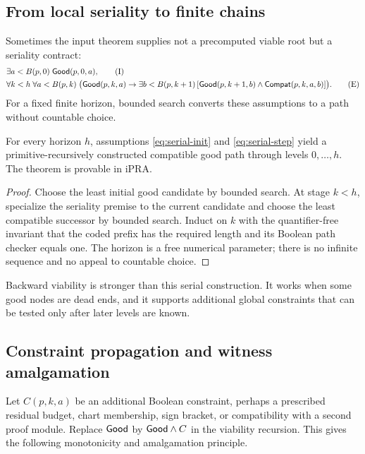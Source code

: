 \subsection{From local seriality to finite chains}

Sometimes the input theorem supplies not a precomputed viable root but a
seriality contract:
\begin{align*}
 &\exists a<B(p,0)\;\mathsf{Good}(p,0,a),\tag{I}\label{eq:serial-init}\\
 &\forall k<h\;\forall a<B(p,k)\;
   \bigl(\mathsf{Good}(p,k,a)\to
     \exists b<B(p,k+1)\,[\mathsf{Good}(p,k+1,b)\wedge\mathsf{Compat}(p,k,a,b)]\bigr).
   \tag{E}\label{eq:serial-step}
\end{align*}
For a fixed finite horizon, bounded search converts these assumptions to a
path without countable choice.

\begin{theorem}
\label{thm:finite-dependent-choice}
For every horizon \(h\), assumptions \eqref{eq:serial-init} and
\eqref{eq:serial-step} yield a primitive-recursively constructed compatible
good path through levels \(0,\ldots,h\).  The theorem is provable in iPRA.
\end{theorem}

\begin{proof}
Choose the least initial good candidate by bounded search.  At stage \(k<h\),
specialize the seriality premise to the current candidate and choose the least
compatible successor by bounded search.  Induct on \(k\) with the
quantifier-free invariant that the coded prefix has the required length and
its Boolean path checker equals one.  The horizon is a free numerical
parameter; there is no infinite sequence and no appeal to countable choice.
\end{proof}

Backward viability is stronger than this serial construction.  It works when
some good nodes are dead ends, and it supports additional global constraints
that can be tested only after later levels are known.

\subsection{Constraint propagation and witness amalgamation}

Let \(C(p,k,a)\) be an additional Boolean constraint, perhaps a prescribed
residual budget, chart membership, sign bracket, or compatibility with a
second proof module.  Replace \(\mathsf{Good}\) by \(\mathsf{Good}\wedge C\) in the viability
recursion.  This gives the following monotonicity and amalgamation principle.

